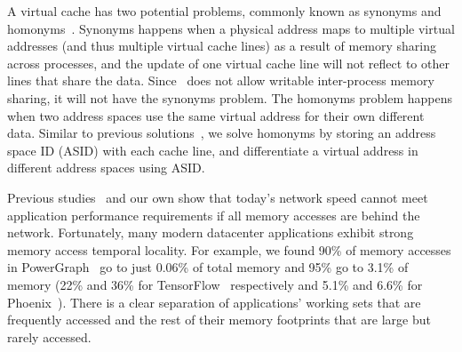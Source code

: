 \documentclass[10pt,times,twocolumn]{z2-article}
\begin{document}
{{{{{{{A virtual cache has two potential problems, commonly known as synonyms and homonyms~\cite{CacheMemory82}.
Synonyms happens when a physical address maps to multiple virtual addresses (and thus multiple virtual cache lines) 
as a result of memory sharing across processes,
and the update of one virtual cache line will not reflect to other lines that share the data.
Since \lego\ does not allow writable inter-process memory sharing,
it will not have the synonyms problem.
The homonyms problem happens when two address spaces use the same virtual address for their own different data.
Similar to previous solutions~\cite{OVC}, we solve homonyms by storing an address space ID (ASID) with each cache line,
and differentiate a virtual address in different address spaces using ASID.

Previous studies~\cite{Gao16-OSDI,GU17-NSDI} and our own show that today's network speed 
cannot meet application performance requirements if all memory accesses are behind the network. 
Fortunately, many modern datacenter applications exhibit strong memory access temporal locality.
For example, we found 90\% of memory accesses in PowerGraph~\cite{Gonzalez12-OSDI} go to just 0.06\% of total memory
and 95\% go to 3.1\% of memory
(22\% and 36\% for TensorFlow~\cite{TensorFlow} respectively
and 5.1\% and 6.6\% for Phoenix~\cite{Ranger07-HPCA}).
There is a clear separation of applications' working sets that are frequently accessed 
and the rest of their memory footprints that are large but rarely accessed.

}}}}}}}
\end{document}
